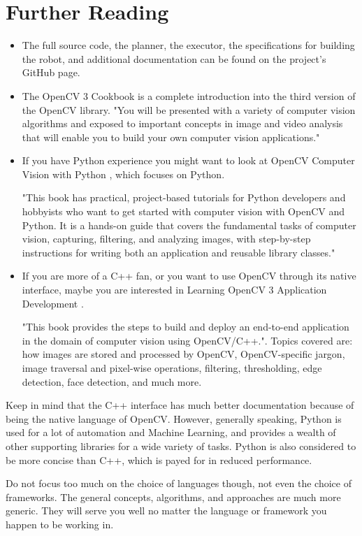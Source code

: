 \documentclass[12pt, a4paper]{article}
\begin{document}
\section{Further Reading}
\begin{itemize}
	\item The full source code, the planner, the executor, the specifications for building the robot, and additional documentation can be found on the project's GitHub page\cite{projectGithub}.
	\item The OpenCV 3 Cookbook \cite{openCVCookbook} is a complete introduction into the third version of the OpenCV library. "You will be presented with a variety of computer vision algorithms and exposed to important concepts in image and video analysis that will enable you to build your own computer vision applications." \cite{openCVCookbookWebsite}

	\item If you have Python experience you might want to look at OpenCV Computer Vision with Python \cite{openCVPython}, which focuses on Python.

	"This book has practical, project-based tutorials for Python developers and hobbyists who want to get started with computer vision with OpenCV and Python. It is a hands-on guide that covers the fundamental tasks of computer vision, capturing, filtering, and analyzing images, with step-by-step instructions for writing both an application and reusable library classes." \cite{openCVPythonWebsite}

	\item If you are more of a C++ fan, or you want to use OpenCV through its native interface, maybe you are interested in Learning OpenCV 3 Application Development \cite{openCVApplicationDevelopment}.

	"This book provides the steps to build and deploy an end-to-end application in the domain of computer vision using OpenCV/C++.". Topics covered are: how images are stored and processed by OpenCV, OpenCV-specific jargon, image traversal and pixel-wise operations, filtering, thresholding, edge detection, face detection, and much more. \cite{openCVApplicationDevelopmentWebsite}
\end{itemize}

Keep in mind that the C++ interface has much better documentation because of being the native language of OpenCV. However, generally speaking, Python is used for a lot of automation and Machine Learning, and provides a wealth of other supporting libraries for a wide variety of tasks. Python is also considered to be more concise than C++, which is payed for in reduced performance.

Do not focus too much on the choice of languages though, not even the choice of frameworks. The general concepts, algorithms, and approaches are much more generic. They will serve you well no matter the language or framework you happen to be working in.

\printbibliography
\end{document}

